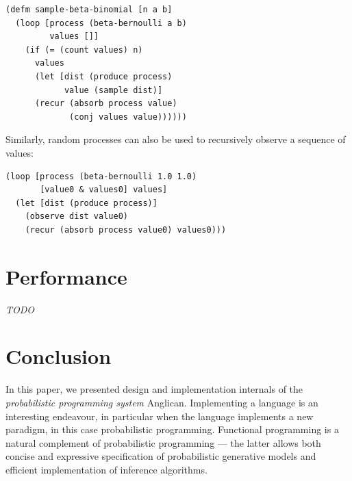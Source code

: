 \documentclass[preprint]{sigplanconf}
\begin{document}
\begin{lstlisting}[style=default]
(defm sample-beta-binomial [n a b]
  (loop [process (beta-bernoulli a b)
         values []]
    (if (= (count values) n)
      values
      (let [dist (produce process)
            value (sample dist)]
      (recur (absorb process value)
             (conj values value))))))
\end{lstlisting}
Similarly, random processes can also be used to recursively observe a sequence of values:
\begin{lstlisting}[style=default]
(loop [process (beta-bernoulli 1.0 1.0)
       [value0 & values0] values] 
  (let [dist (produce process)]
    (observe dist value0)
    (recur (absorb process value0) values0)))
\end{lstlisting}




\section{Performance}

{\it TODO}

\section{Conclusion}
\label{seq:summary}

In this paper, we presented design and implementation internals
of the \emph{probabilistic programming system} Anglican. Implementing
a language is an interesting endeavour, in particular when the
language implements a new paradigm, in this case probabilistic
programming. Functional programming is a natural complement of
probabilistic programming --- the latter allows both concise and
expressive specification of probabilistic generative models and
efficient implementation of inference algorithms.
\end{document}

